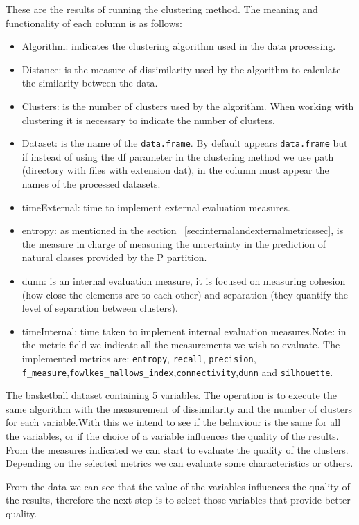 These are the results of running the clustering method. The meaning and functionality of each column is as follows:
\begin{itemize}
  \item Algorithm: indicates the clustering algorithm used in the data processing.
  \item Distance: is the measure of dissimilarity used by the algorithm to calculate the similarity between the data.
  \item Clusters: is the number of clusters used by the algorithm. When working with clustering it is necessary to indicate the number of clusters.
  \item Dataset: is the name of the \texttt{data.frame}. By default appears \texttt{data.frame} but if instead of using the df parameter in the clustering method we use path (directory with files with extension dat), in the column must appear the names of the processed datasets.
  \item timeExternal: time to implement external evaluation measures.
  \item entropy: as mentioned in the section ~\ref{sec:internalandexternalmetricssec}, is the measure in charge of measuring the uncertainty in the prediction of natural classes provided by the P partition.
  \item dunn: is an internal evaluation measure, it is focused on measuring cohesion (how close the elements are to each other) and separation (they quantify the level of separation between clusters).
  \item timeInternal: time taken to implement internal evaluation measures.Note: in the metric field we indicate all the measurements we wish to evaluate. The implemented metrics are: \texttt{entropy}, \texttt{recall}, \texttt{precision}, \texttt{f\_measure},\texttt{fowlkes\_mallows\_index},\texttt{connectivity},\texttt{dunn} and \texttt{silhouette}.
\end{itemize}

The basketball dataset containing 5 variables. The operation is to execute the same algorithm with the measurement of dissimilarity and the number of clusters for each variable.With this we intend to see if the behaviour is the same for all the variables, or if the choice of a variable influences the quality of the results. From the measures indicated we can start to evaluate the quality of the clusters. Depending on the selected metrics we can evaluate some characteristics or others.

From the data we can see that the value of the variables influences the quality of the results, therefore the next step is to select those variables that provide better quality.

